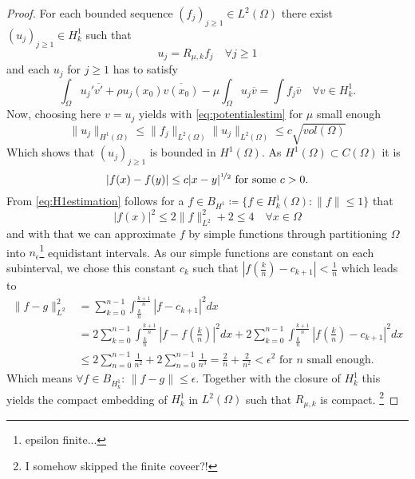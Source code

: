 \begin{theorem}
	\begin{proof}
	For each bounded sequence $(f_{j})_{j \geq 1} \in L^{2}(\Omega)$ there exist $(u_{j})_{j \geq 1} \in H^{1}_{k}$ such that
		\[ u_{j} = R_{\mu, k} f_{j} \quad \forall j \geq 1 \]
	and each $u_{j}$ for $j \geq 1$ has to satisfy
		\[ \int_{\Omega} u_{j}' \overline{v'} + \rho u_{j}(x_{0}) \overline{v(x_{0})} - \mu \int_{\Omega} u_{j} \overline{v} = \int f_{j} \overline{v} \quad \forall v \in H^{1}_{k}. \]
	Now, choosing here $v = u_{j}$ yields with \eqref{eq:potentialestim} for $\mu$ small enough
		\[  \| u_{j} \|_{H^{1}(\Omega)} \leq \| f_{j} \|_{L^{2}(\Omega)} \| u_{j} \|_{L^{2}(\Omega)} \leq c \sqrt{vol(\Omega)} \]
	Which shows that $(u_{j})_{j \geq 1}$ is bounded in $H^{1}(\Omega)$. As $H^1(\Omega) \subset C(\Omega)$ it is
		\begin{equation}
			|f(x) - f(y)| \leq c |x - y|^{\nicefrac{1}{2}} \text{ for some } c > 0. \label{eq:H1estimation}
		\end{equation}  
		From \eqref{eq:H1estimation} follows for a $f \in B_{H^{1}} \coloneqq \{ f \in H^{1}_{k}(\Omega) : \| f \| \leq 1 \}$ that 
		\[ |f(x)|^{2} \leq 2 \| f \|^{2}_{L^{2}} + 2 \leq 4 \quad \forall x \in \Omega \]
		and with that we can approximate $f$ by simple functions through partitioning $\Omega$ into $n_{\epsilon}$\footnote{epsilon finite...} equidistant intervals. As our simple functions are constant on each subinterval, we chose this constant $c_{k}$ such that $|f(\frac{k}{n}) - c_{k + 1}| < \frac{1}{n}$ which leads to
		\begin{align*}
			\| f - g \|^{2}_{L^{2}} & = \sum_{k = 0}^{n-1} \int_{\frac{k}{n}}^{\frac{k+1}{n}} | f - c_{k+1} |^{2} dx \\
				& =  2 \sum_{k = 0}^{n-1} \int_{\frac{k}{n}}^{\frac{k+1}{n}} | f - f(\frac{k}{n}) |^{2} dx +  2 \sum_{k = 0}^{n-1} \int_{\frac{k}{n}}^{\frac{k+1}{n}} | f(\frac{k}{n}) - c_{k+1} |^{2} dx \\
				& \leq 2 \sum_{n = 0}^{n-1} \frac{1}{n^{2}} + 2 \sum_{n=0}^{n-1} \frac{1}{n^{3}} = \frac{2}{n} + \frac{2}{n^{2}} < \epsilon^{2} \text{ for } n \text{ small enough.}
		\end{align*}		 
		Which means $\forall f \in B_{H^{1}_{k}}$: $\| f - g \| \leq \epsilon$. Together with the closure of $H^{1}_{k}$ this yields the compact embedding of $H^{1}_{k}$ in $L^{2}(\Omega)$ such that $R_{\mu, k}$ is compact. \footnote{I somehow skipped the finite coveer?!}
	\end{proof}	
\end{theorem}

